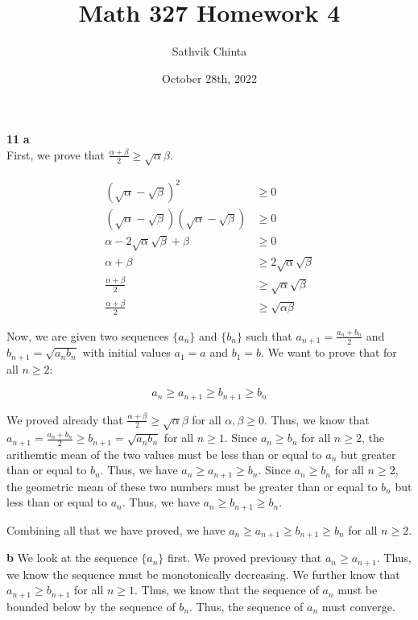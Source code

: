 \documentclass[addpoints]{exam}
\title{Math 327 Homework 4}
\author{Sathvik Chinta}
\date{October 28th, 2022}
\begin{document}
\maketitle

\begin{questions}
\question \textbf{11} \textbf{a}\\

First, we prove that $\frac{\alpha + \beta}{2} \geq \sqrt{\alpha}{\beta}$. 

\begin{align*}
    (\sqrt{\alpha} - \sqrt{\beta})^2 &\geq 0\\
    (\sqrt{\alpha} - \sqrt{\beta})(\sqrt{\alpha} - \sqrt{\beta}) &\geq 0\\
    \alpha - 2\sqrt{\alpha}\sqrt{\beta} + \beta &\geq 0\\
    \alpha + \beta &\geq 2\sqrt{\alpha}\sqrt{\beta}\\
    \frac{\alpha + \beta}{2} &\geq \sqrt{\alpha}\sqrt{\beta}\\
    \frac{\alpha + \beta}{2} &\geq \sqrt{\alpha\beta}
\end{align*}

Now, we are given two sequences $\{a_n\}$ and $\{b_n\}$ such that 
$a_{n+1} = \frac{a_n + b_n}{2}$ and $b_{n+1} = \sqrt{a_nb_n}$ with initial values $a_1 = a$ and $b_1 = b$. We want 
to prove that for all $n \geq 2$:

\[a_n \geq a_{n+1} \geq b_{n+1} \geq b_n\]

We proved already that $\frac{\alpha + \beta}{2} \geq \sqrt{\alpha}{\beta}$ for all $\alpha, \beta \geq 0$. 
Thus, we know that $a_{n+1} = \frac{a_n + b_n}{2} \geq b_{n+1} = \sqrt{a_nb_n}$ for all $n \geq 1$. Since
$a_{n} \geq b_{n}$ for all $n \geq 2$, the arithemtic mean of the two values must be less than or equal to $a_n$ but greater than or 
equal to $b_n$. Thus, we have $a_n \geq a_{n+1} \geq b_n$. Since $a_{n} \geq b_{n}$ for all $n \geq 2$, the geometric mean of these two numbers
must be greater than or equal to $b_n$ but less than or equal to $a_n$. Thus, we have $a_n \geq b_{n+1} \geq b_n $. 

Combining all that we have proved, we have $a_n \geq a_{n+1} \geq b_{n+1} \geq b_n$ for all $n \geq 2$.

\textbf{b} We look at the sequence $\{a_n\}$ first. We proved previousy that $a_n \geq a_{n+1}$. Thus, we know the sequence
must be monotonically decreasing. We further know that $a_{n+1} \geq b_{n+1}$ for all $n \geq 1$. Thus, we know that the sequence 
of $a_n$ must be bounded below by the sequence of $b_n$. Thus, the sequence of $a_n$ must converge. 


\end{questions}
\end{document}
